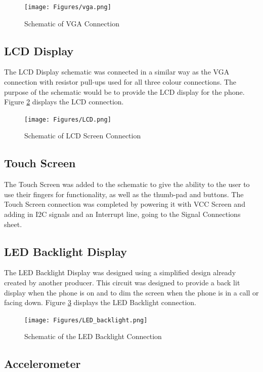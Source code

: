 \begin{figure}
	\texttt{[image: Figures/vga.png]}\centering
	\caption{Schematic of VGA Connection}
	\label{fig:VGA}
\end{figure}

\subsection{LCD Display}
\label{chap:LCD}

	The LCD Display schematic was connected in a similar way as the VGA connection with resistor pull-ups used for all three colour connections. 
The purpose of the schematic would be to provide the LCD display for the phone.
Figure \ref{fig:LCD} displays the LCD connection.

\begin{figure}
	\texttt{[image: Figures/LCD.png]}\centering
	\caption{Schematic of LCD Screen Connection}
	\label{fig:LCD}
\end{figure}

\subsection{Touch Screen}
\label{chap:touch}

	The Touch Screen was added to the schematic to give the ability to the user to use their fingers for functionality, as well as the thumb-pad and buttons. 
The Touch Screen connection was completed by powering it with VCC Screen and adding in I2C signals and an Interrupt line, going to the Signal Connections sheet.

\subsection{LED Backlight Display}

	The LED Backlight Display was designed using a simplified design already created by another producer. This circuit was designed to provide a back lit display when the phone is on and to dim the screen when the phone is in a call or facing down.
Figure \ref{fig:backlight} displays the LED Backlight connection. 

\begin{figure}
	\texttt{[image: Figures/LED\_backlight.png]}\centering
	\caption{Schematic of the LED Backlight Connection}
	\label{fig:backlight}
\end{figure}

\subsection{Accelerometer}
\label{chap:a}

